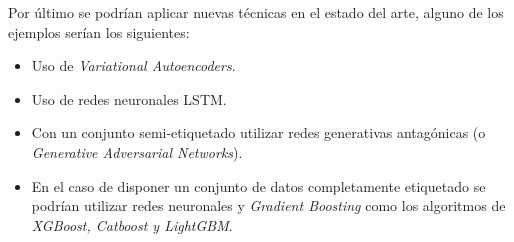 Por último se podrían aplicar nuevas técnicas en el estado del arte, alguno de los ejemplos serían los siguientes:

\begin{itemize}
    \item Uso de \textit{Variational Autoencoders}.
    \item Uso de redes neuronales LSTM.
    \item Con un conjunto semi-etiquetado utilizar redes generativas antagónicas (o \textit{Generative Adversarial Networks}).
    \item En el caso de disponer un conjunto de datos completamente etiquetado se podrían utilizar redes neuronales y \textit{Gradient Boosting} como los algoritmos de \textit{XGBoost, Catboost y LightGBM}.
\end{itemize}